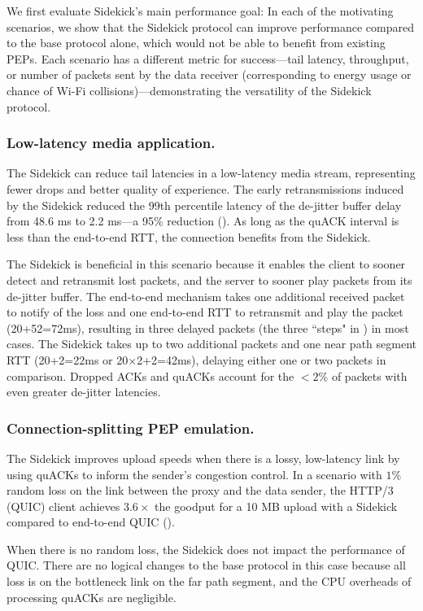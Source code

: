 We first evaluate Sidekick's main performance goal: In each of the motivating
scenarios, we show that the Sidekick protocol can improve performance compared
to the base protocol alone, which would not be able to benefit from existing
PEPs. Each scenario has a different metric for success---tail latency,
throughput, or number of packets sent by the data receiver (corresponding to
energy usage or chance of Wi-Fi collisions)---demonstrating the versatility of
the Sidekick protocol.

\subsubsection{Low-latency media application.}
The Sidekick can reduce tail latencies in a low-latency media stream, representing
fewer drops and better quality of experience.
The early retransmissions induced by the Sidekick reduced the 99th percentile
latency of the de-jitter buffer delay from 48.6 ms to 2.2 ms---a 95\%
reduction ().
As long as the quACK interval is less than the end-to-end RTT, the connection
benefits from the Sidekick.

The Sidekick is beneficial in this scenario because it enables the client to sooner
detect and retransmit lost packets, and the server to sooner play packets from
its de-jitter buffer.
The end-to-end mechanism takes one additional received packet to notify of the
loss and
one end-to-end RTT to retransmit and play the packet (20+52=72ms), resulting in
three delayed packets (the three ``steps" in ) in most cases.
The Sidekick takes up to two additional packets and one near path segment RTT
(20+2=22ms or 20$\times$2+2=42ms), delaying either one or two packets in comparison.
Dropped ACKs and quACKs account for the $<2\%$ of packets with even greater
de-jitter latencies.

\subsubsection{Connection-splitting PEP emulation.}
The Sidekick improves upload speeds when there is a lossy, low-latency link
by using quACKs to inform the sender's congestion control.
In a scenario with $1\%$ random loss on the link between the proxy and the
data sender, the HTTP/3 (QUIC) client achieves $3.6\times$ the goodput for a 10 MB
upload with a Sidekick compared to end-to-end QUIC ().

When there is no random loss, the Sidekick does not impact the performance
of QUIC\@.
There are no logical changes to the base protocol in this case because all loss
is on the
bottleneck link on the far path segment, and the CPU overheads of processing quACKs
are negligible.

